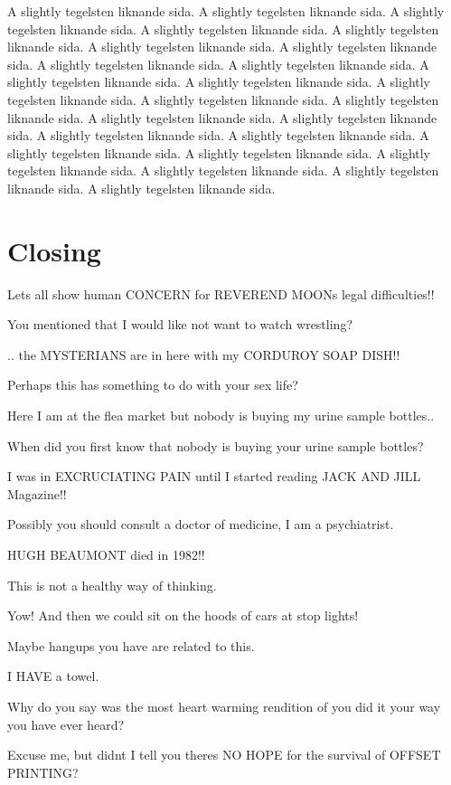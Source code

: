 \documentclass[cropmarks, frame, english]{idamasterthesis}
\begin{document}
A slightly tegelsten liknande sida. 
A slightly tegelsten liknande sida. 
A slightly tegelsten liknande sida. 
A slightly tegelsten liknande sida. 
A slightly tegelsten liknande sida. 
A slightly tegelsten liknande sida. 
A slightly tegelsten liknande sida. 
A slightly tegelsten liknande sida. 
A slightly tegelsten liknande sida. 
A slightly tegelsten liknande sida. 
A slightly tegelsten liknande sida. 
A slightly tegelsten liknande sida. 
A slightly tegelsten liknande sida. 
A slightly tegelsten liknande sida. 
A slightly tegelsten liknande sida. 
A slightly tegelsten liknande sida. 
A slightly tegelsten liknande sida. 
A slightly tegelsten liknande sida. 
A slightly tegelsten liknande sida. 
A slightly tegelsten liknande sida. 
A slightly tegelsten liknande sida. 
A slightly tegelsten liknande sida. 
A slightly tegelsten liknande sida. 
A slightly tegelsten liknande sida. 

\chapter{Closing}


Lets all show human CONCERN for REVEREND MOONs legal difficulties!!

You mentioned that I would like not want to watch wrestling?

..  the MYSTERIANS are in here with my CORDUROY SOAP DISH!!

Perhaps this has something to do with your sex life?

Here I am at the flea market but nobody is buying
 my urine sample bottles..

When did you first know that nobody is buying your urine sample
bottles?

I was in EXCRUCIATING PAIN until I started reading JACK AND JILL
 Magazine!!

Possibly you should consult a doctor of medicine, I am a psychiatrist.

HUGH BEAUMONT died in 1982!!

This is not a healthy way of thinking.

Yow!  And then we could sit on the hoods of cars at stop lights!

Maybe hangups you have are related to this.

I HAVE a towel.

Why do you say was the most heart warming rendition of you did it your
way you have ever heard?

Excuse me, but didnt I tell you theres NO HOPE for the
 survival of OFFSET PRINTING?
\end{document}
